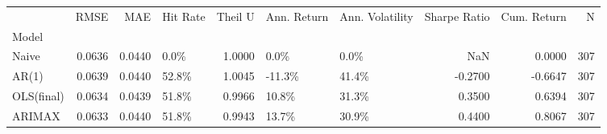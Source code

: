 \begin{tabular}{lrrlrllrrr}
\toprule
{} &   RMSE &    MAE & Hit Rate &  Theil U & Ann. Return & Ann. Volatility &  Sharpe Ratio &  Cum. Return &    N \\
Model      &        &        &          &          &             &                 &               &              &      \\
\midrule
Naive      & 0.0636 & 0.0440 &     0.0\% &   1.0000 &        0.0\% &            0.0\% &           NaN &       0.0000 &  307 \\
AR(1)      & 0.0639 & 0.0440 &    52.8\% &   1.0045 &      -11.3\% &           41.4\% &       -0.2700 &      -0.6647 &  307 \\
OLS(final) & 0.0634 & 0.0439 &    51.8\% &   0.9966 &       10.8\% &           31.3\% &        0.3500 &       0.6394 &  307 \\
ARIMAX     & 0.0633 & 0.0440 &    51.8\% &   0.9943 &       13.7\% &           30.9\% &        0.4400 &       0.8067 &  307 \\
\bottomrule
\end{tabular}
